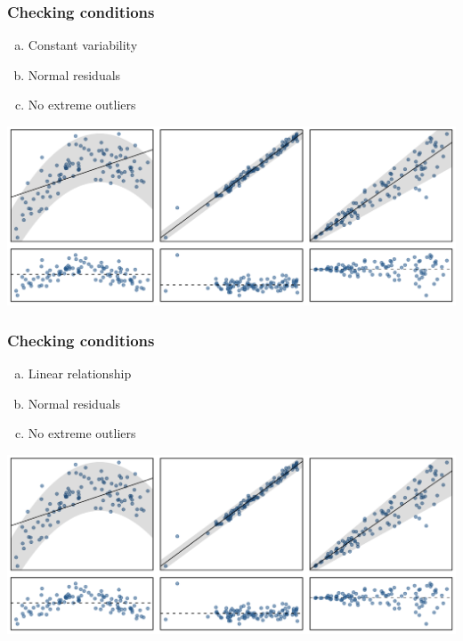 
\begin{frame}
\frametitle{Checking conditions}

{
\begin{enumerate}[(a)]
\item Constant variability
\item Normal residuals
\item No extreme outliers
\end{enumerate}
}
{
\begin{center}
\includegraphics[width=\textwidth]{8-2_least_square_reg/figures/problems/nonlinear}
\end{center}
}

\end{frame}


\begin{frame}
\frametitle{Checking conditions}

{
\begin{enumerate}[(a)]
\item Linear relationship
\item Normal residuals
\item No extreme outliers
\end{enumerate}
}
{
\begin{center}
\includegraphics[width=\textwidth]{8-2_least_square_reg/figures/problems/heteroscedastic}
\end{center}
}

\end{frame}

